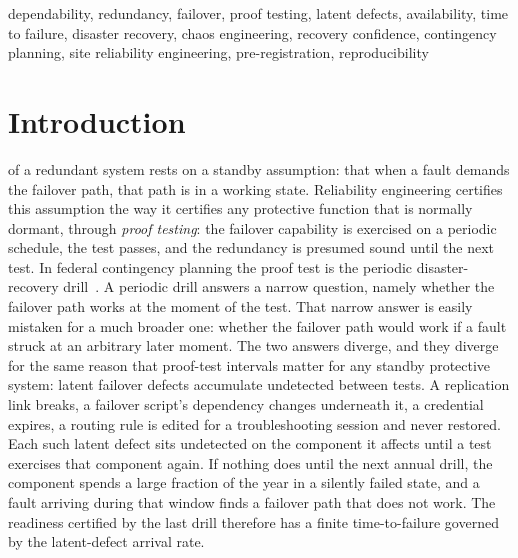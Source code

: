 \documentclass[journal]{IEEEtran}
\begin{document}
\begin{IEEEkeywords}
dependability, redundancy, failover, proof testing, latent defects, availability, time to failure,
disaster recovery, chaos engineering, recovery confidence, contingency planning, site reliability
engineering, pre-registration, reproducibility
\end{IEEEkeywords}

\section{Introduction}
 of a redundant system rests on a standby assumption: that when a
fault demands the failover path, that path is in a working state. Reliability engineering certifies
this assumption the way it certifies any protective function that is normally dormant, through
\emph{proof testing}: the failover capability is exercised on a periodic schedule, the test passes,
and the redundancy is presumed sound until the next test. In federal contingency planning the
proof test is the periodic disaster-recovery drill~\cite{nist80034}. A periodic drill answers a
narrow question, namely whether the failover path works at the moment of the test. That narrow
answer is easily mistaken for a much broader one: whether the failover path would work if a fault
struck at an arbitrary later moment. The two answers diverge, and they diverge for the same reason
that proof-test intervals matter for any standby protective system: latent failover defects
accumulate undetected between tests. A replication link breaks, a failover script's dependency
changes underneath it, a credential expires, a routing rule is edited for a troubleshooting session
and never restored. Each such latent defect sits undetected on the component it affects until a test
exercises that component again. If nothing does until the next annual drill, the component spends a
large fraction of the year in a silently failed state, and a fault arriving during that window finds
a failover path that does not work. The readiness certified by the last drill therefore has a
finite time-to-failure governed by the latent-defect arrival rate.
\end{document}
